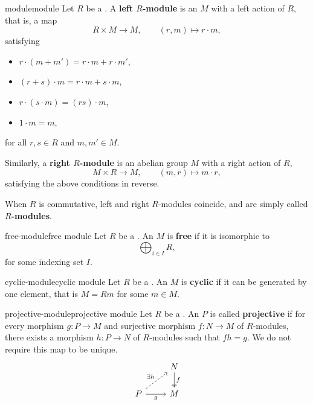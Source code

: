 \begin{topic}{module}{module}
    Let $R$ be a . A \textbf{left $R$-module} is an  $M$ with a left action of $R$, that is, a map
    \[ R \times M \to M, \qquad (r, m) \mapsto r \cdot m, \]
    satisfying
    \begin{itemize}
        \item $r \cdot (m + m') = r \cdot m + r \cdot m'$,
        \item $(r + s) \cdot m = r \cdot m + s \cdot m$,
        \item $r \cdot (s \cdot m) = (rs) \cdot m$,
        \item $1 \cdot m = m$,
    \end{itemize}
    for all $r, s \in R$ and $m, m' \in M$.
    
    Similarly, a \textbf{right $R$-module} is an abelian group $M$ with a right action of $R$,
    \[ M \times R \to M, \qquad (m, r) \mapsto m \cdot r , \]
    satisfying the above conditions in reverse.
    
    When $R$ is commutative, left and right $R$-modules coincide, and are simply called \textbf{$R$-modules}.
\end{topic}

\begin{topic}{free-module}{free module}
    Let $R$ be a . An  $M$ is \textbf{free} if it is isomorphic to
    \[ \bigoplus_{i \in I} R , \]
    for some indexing set $I$.
\end{topic}

\begin{topic}{cyclic-module}{cyclic module}
    Let $R$ be a . An  $M$ is \textbf{cyclic} if it can be generated by one element, that is $M = Rm$ for some $m \in M$.
\end{topic}

\begin{topic}{projective-module}{projective module}
    Let $R$ be a . An  $P$ is called \textbf{projective} if for every morphism $g : P \to M$ and surjective morphism $f : N \to M$ of $R$-modules, there exists a morphism $h : P \to N$ of $R$-modules such that $fh = g$. We do not require this map to be unique.
    \[ \begin{tikzcd} & N \arrow[twoheadrightarrow]{d}{f} \\ P \arrow[swap]{r}{g} \arrow[dashed]{ur}{\exists h} & M \end{tikzcd} \]
\end{topic}

